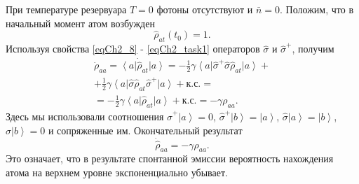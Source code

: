 При температуре резервуара  $T = 0$  фотоны отсутствуют и $\bar{n} =
0$.  Положим, что в начальный момент атом возбужден 
\[
\hat{\rho}_{at}\left(t_0\right) = 1.
\]
Используя свойства \eqref{eqCh2_8} - \eqref{eqCh2_task1} операторов 
$\hat{\sigma}$ и $\hat{\sigma}^{+}$, получим   
\begin{eqnarray}
\dot{\rho}_{aa} = \left<a\right|\dot{\hat{\rho}}_{at}\left|a\right> =
-\frac{1}{2}\gamma
\left<a\right|\hat{\sigma}^{+}\hat{\sigma}\hat{\rho}_{at}\left|a\right>
+ 
\nonumber \\
+ \frac{1}{2}\gamma
\left<a\right|\hat{\sigma}\hat{\rho}_{at}\hat{\sigma}^{+}\left|a\right>
+ \mbox{к.с.} = 
\nonumber \\
= 
- \frac{1}{2}\gamma
\left<a\right|\hat{\rho}_{at}\left|a\right> + \mbox{к.с.} = 
- \gamma \rho_{aa}.
\label{eqCh2_101}
\end{eqnarray}
Здесь мы использовали соотношения
\(\hat{\sigma}^{+}\left|a\right> = 0\),
\(\hat{\sigma}^{+}\left|b\right> = \left|a\right>\),
\(\hat{\sigma}\left|a\right> = \left|b\right>\),
\(\hat{\sigma}\left|b\right> = 0\)
и сопряженные им. Окончательный результат 
\begin{equation}
\dot{\hat{\rho}}_{aa} = - \gamma \rho_{aa}.
\label{eqCh2_102}
\end{equation}
Это означает, что в результате спонтанной эмиссии вероятность
нахождения атома на верхнем уровне экспоненциально убывает. 
